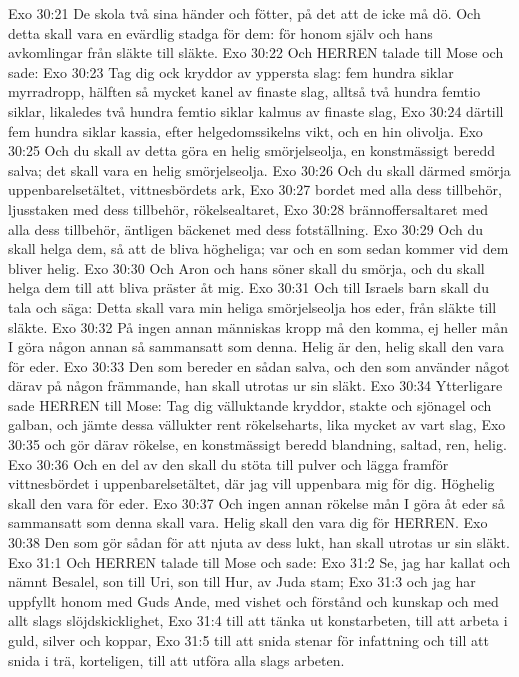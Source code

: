 Exo 30:21  De skola två sina händer och fötter, på det att de icke må dö. Och detta skall vara en evärdlig stadga för dem: för honom själv och hans avkomlingar från släkte till släkte.
Exo 30:22  Och HERREN talade till Mose och sade:
Exo 30:23  Tag dig ock kryddor av yppersta slag: fem hundra siklar myrradropp, hälften så mycket kanel av finaste slag, alltså två hundra femtio siklar, likaledes två hundra femtio siklar kalmus av finaste slag,
Exo 30:24  därtill fem hundra siklar kassia, efter helgedomssikelns vikt, och en hin olivolja.
Exo 30:25  Och du skall av detta göra en helig smörjelseolja, en konstmässigt beredd salva; det skall vara en helig smörjelseolja.
Exo 30:26  Och du skall därmed smörja uppenbarelsetältet, vittnesbördets ark,
Exo 30:27  bordet med alla dess tillbehör, ljusstaken med dess tillbehör, rökelsealtaret,
Exo 30:28  brännoffersaltaret med alla dess tillbehör, äntligen bäckenet med dess fotställning.
Exo 30:29  Och du skall helga dem, så att de bliva högheliga; var och en som sedan kommer vid dem bliver helig.
Exo 30:30  Och Aron och hans söner skall du smörja, och du skall helga dem till att bliva präster åt mig.
Exo 30:31  Och till Israels barn skall du tala och säga: Detta skall vara min heliga smörjelseolja hos eder, från släkte till släkte.
Exo 30:32  På ingen annan människas kropp må den komma, ej heller mån I göra någon annan så sammansatt som denna. Helig är den, helig skall den vara för eder.
Exo 30:33  Den som bereder en sådan salva, och den som använder något därav på någon främmande, han skall utrotas ur sin släkt.
Exo 30:34  Ytterligare sade HERREN till Mose: Tag dig välluktande kryddor, stakte och sjönagel och galban, och jämte dessa vällukter rent rökelseharts, lika mycket av vart slag,
Exo 30:35  och gör därav rökelse, en konstmässigt beredd blandning, saltad, ren, helig.
Exo 30:36  Och en del av den skall du stöta till pulver och lägga framför vittnesbördet i uppenbarelsetältet, där jag vill uppenbara mig för dig. Höghelig skall den vara för eder.
Exo 30:37  Och ingen annan rökelse mån I göra åt eder så sammansatt som denna skall vara. Helig skall den vara dig för HERREN.
Exo 30:38  Den som gör sådan för att njuta av dess lukt, han skall utrotas ur sin släkt.
Exo 31:1  Och HERREN talade till Mose och sade:
Exo 31:2  Se, jag har kallat och nämnt Besalel, son till Uri, son till Hur, av Juda stam;
Exo 31:3  och jag har uppfyllt honom med Guds Ande, med vishet och förstånd och kunskap och med allt slags slöjdskicklighet,
Exo 31:4  till att tänka ut konstarbeten, till att arbeta i guld, silver och koppar,
Exo 31:5  till att snida stenar för infattning och till att snida i trä, korteligen, till att utföra alla slags arbeten.
